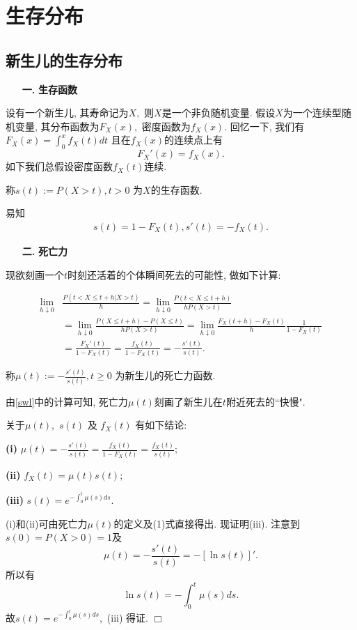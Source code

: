 \documentclass[a4paper,10pt]{ctexbook}
\newcommand{\hei}{\CJKfamily{hei}}      %
\def\qed{\hfill$\Box$\medskip}
\def\no{\nonumber}
\begin{document}
\mainmatter
\chapter{生存分布}
\section{新生儿的生存分布}
\begin{itemize}
    \item[{\bf\hei 一.}]{\bf\hei 生存函数}
\end{itemize}

设有一个新生儿, 其寿命记为$X,$ 则$X$是一个非负随机变量. 假设$X$为一个连续型随机变量, 其分布函数为$F_X(x),$ 密度函数为$f_X(x).$ 回忆一下, 我们有 $F_X(x)=\int_0^x f_X(t)dt$ 且在$f_X(x)$的连续点上有
$$F_X'(x)=f_X(x).$$
如下我们总假设密度函数$f_X(t)$连续.
\begin{definition}
    称$s(t):=P(X>t),t>0$ 为$X$的生存函数.
\end{definition}
易知
\begin{align}\label{sf}
    s(t)=1-F_X(t), s'(t)=-f_X(t).
\end{align}

\begin{itemize}
    \item[{\bf\hei  二.}]{\bf\hei 死亡力}
\end{itemize}

现欲刻画一个$t$时刻还活着的个体瞬间死去的可能性, 做如下计算:

\begin{align}\label{swl}
    \lim_{h\downarrow0} & \frac{P(t<X\le t+h|X>t)}{h}=\lim_{h\downarrow0} \frac{P(t<X\le t+h)}{hP(X>t)}\no                                            \\
                        & =\lim_{h\downarrow0}\frac{P(X\le t+h)-P(X\le t)}{hP(X>t)}=\lim_{h\downarrow0}\frac{F_X(t+h)-F_X(t)}{h}\frac{1}{1-F_X(t)}\no \\
                        & =\frac{F_X'(t)}{1-F_X(t)}=\frac{f_X(t)}{1-F_X(t)}=-\frac{s'(t)}{s(t)}.
\end{align}

\begin{definition}
    称$\mu(t):=-\frac{s'(t)}{s(t)},t\ge 0$ 为新生儿的死亡力函数.
\end{definition}
由\eqref{swl}中的计算可知, 死亡力$\mu(t)$刻画了新生儿在$t$附近死去的``快慢".

\begin{proposition} 关于$\mu(t),$ $s(t)$ 及 $f_X(t)$ 有如下结论:

    {\rm\bf(i)} $\mu(t)=-\frac{s'(t)}{s(t)}=\frac{f_X(t)}{1-F_X(t)}=\frac{f_X(t)}{s(t)};$

    {\rm\bf(ii)} $f_X(t)=\mu(t)s(t);$

    {\rm\bf(iii)} $s(t)=e^{-\int_0^t\mu(s)ds}.$

\end{proposition}
\proof (i)和(ii)可由死亡力$\mu(t)$的定义及(1)式直接得出. 现证明(iii). 注意到$s(0)=P(X>0)=1$及
$$\mu(t)=-\frac{s'(t)}{s(t)}=-[\ln s(t)]'.$$ 所以有
$$\ln s(t)=-\int_0^t\mu(s)ds.$$ 故$s(t)=e^{-\int_0^t\mu(s)ds},$ (iii) 得证. \qed
\end{document}
